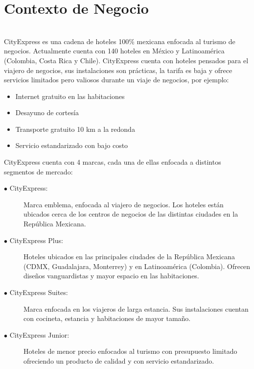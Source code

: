 \documentclass{article}\usepackage[]{graphicx}\usepackage[]{color}
\begin{document}
\section {Contexto de Negocio} ~ \\
CityExpress es una cadena de hoteles 100\% mexicana enfocada al turismo de negocios. Actualmente cuenta con 140 hoteles en México y Latinoamérica (Colombia, Costa Rica y Chile). CityExpress cuenta con hoteles pensados para el viajero de negocios, sus instalaciones son prácticas, la tarifa es baja y ofrece servicios limitados pero valiosos durante un viaje de negocios, por ejemplo:
\begin{itemize}[noitemsep]
\item Internet gratuito en las habitaciones
\item Desayuno de cortesía
\item Transporte gratuito 10 km a la redonda
\item Servicio estandarizado con bajo costo
\end{itemize}
CityExpress cuenta con 4 marcas, cada una de ellas enfocada a distintos segmentos de mercado:
\begin{description}
\item [$\bullet$ CityExpress:] Marca emblema, enfocada al viajero de negocios. Los hoteles están ubicados cerca de los centros de negocios de las distintas ciudades en la República Mexicana.
\item [$\bullet$ CityExpress Plus:] Hoteles ubicados en las principales ciudades de la República Mexicana (CDMX, Guadalajara, Monterrey) y en Latinoamérica (Colombia). Ofrecen diseños vanguardistas y mayor espacio en las habitaciones.
\item [$\bullet$ CityExpress Suites:] Marca enfocada en los viajeros de larga estancia. Sus instalaciones cuentan con cocineta, estancia y habitaciones de mayor tamaño.
\item [$\bullet$ CityExpress Junior:] Hoteles de menor precio enfocados al turismo con presupuesto limitado ofreciendo un producto de calidad y con servicio estandarizado.
\end{description}
\end{document}
